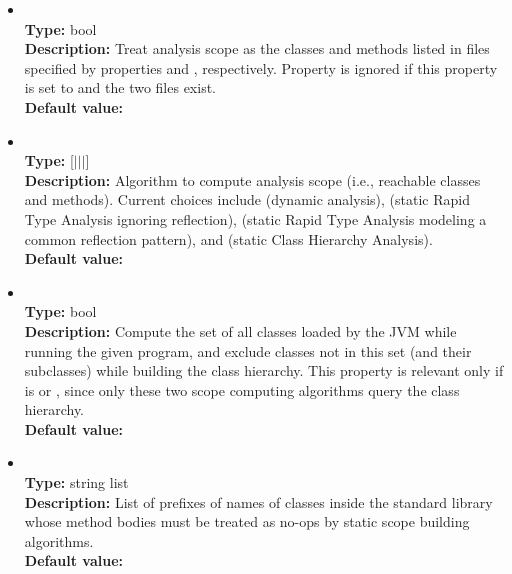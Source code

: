 \begin{itemize}
\item
{} \\
{\bf Type:} bool \\
{\bf Description:} Treat analysis scope as the classes and methods listed in files specified by properties  and , respectively.  Property  is ignored if this property is set to  and the two files exist. \\
{\bf Default value:} 

\item
{} \\
{\bf Type:} [$|$$|$$|$] \\
{\bf Description:} Algorithm to compute analysis scope (i.e., reachable classes and methods).  Current choices include  (dynamic analysis),  (static Rapid Type Analysis ignoring reflection),  (static Rapid Type Analysis modeling a common reflection pattern), and  (static Class Hierarchy Analysis). \\
{\bf Default value:} 

\item
{} \\
{\bf Type:} bool \\
{\bf Description:} Compute the set of all classes loaded by the JVM while running the given program, and exclude classes not in this set (and their subclasses) while building the class hierarchy.  This property is relevant only if  is  or , since only these two scope computing algorithms query the class hierarchy. \\
{\bf Default value:}  


\item
{} \\
{\bf Type:} string list \\
{\bf Description:} List of prefixes of names of classes inside the standard library whose method bodies must be treated as no-ops by static scope building algorithms. \\
{\bf Default value:} 


\end{itemize}
